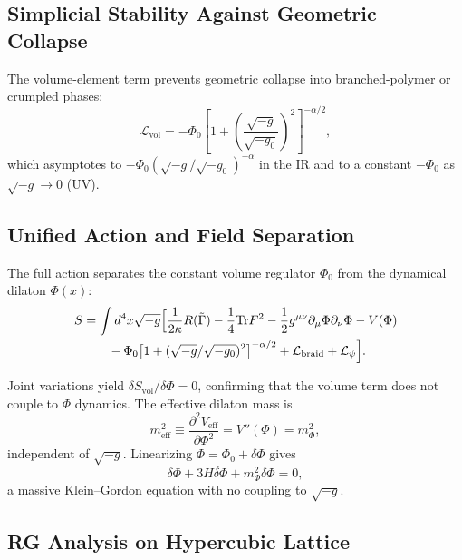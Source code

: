 \documentclass[twocolumn,prd,amsmath,amssymb]{revtex4-2}
\begin{document}
\subsection{Simplicial Stability Against Geometric Collapse}

The volume-element term prevents geometric collapse into branched-polymer or crumpled
phases:
\begin{equation}
\mathcal{L}_{\text{vol}} = -\Phi_0\left[1+\left(\frac{\sqrt{-g}}{\sqrt{-g_0}}\right)^{2}\right]^{-\alpha/2},
\label{eq:vol-term}
\end{equation}
which asymptotes to $-\Phi_0(\sqrt{-g}/\sqrt{-g_0})^{-\alpha}$ in the IR and to a
constant $-\Phi_0$ as $\sqrt{-g}\to0$ (UV).

\subsection{Unified Action and Field Separation}

The full action separates the constant volume regulator $\Phi_0$ from the dynamical
dilaton $\Phi(x)$:
\begin{align}
S &= \int d^4x\sqrt{-g}\Bigl[\frac{1}{2\kappa}R(\tilde{\Gamma})
- \frac14\mathrm{Tr}F^2 - \frac12 g^{\mu\nu}\partial_\mu\Phi\partial_\nu\Phi
- V(\Phi) \nonumber \\
&\qquad - \Phi_0\bigl[1+(\sqrt{-g}/\sqrt{-g_0})^{2}\bigr]^{-\alpha/2}
+ \mathcal{L}_{\text{braid}} + \mathcal{L}_\psi\Bigr].
\label{eq:unified-action}
\end{align}

Joint variations yield $\delta S_{\text{vol}}/\delta\Phi = 0$, confirming that the
volume term does not couple to $\Phi$ dynamics.  The effective dilaton mass is
\begin{equation}
m_{\text{eff}}^2 \equiv \frac{\partial^2 V_{\text{eff}}}{\partial\Phi^2}
= V''(\Phi) = m_\Phi^2,
\label{eq:meff}
\end{equation}
independent of $\sqrt{-g}$.  Linearizing $\Phi = \Phi_0 + \delta\Phi$ gives
\begin{equation}
\ddot{\delta\Phi} + 3H\dot{\delta\Phi} + m_\Phi^2\delta\Phi = 0,
\label{eq:kg-lin}
\end{equation}
a massive Klein--Gordon equation with no coupling to $\sqrt{-g}$.

\subsection{RG Analysis on Hypercubic Lattice}
\end{document}
